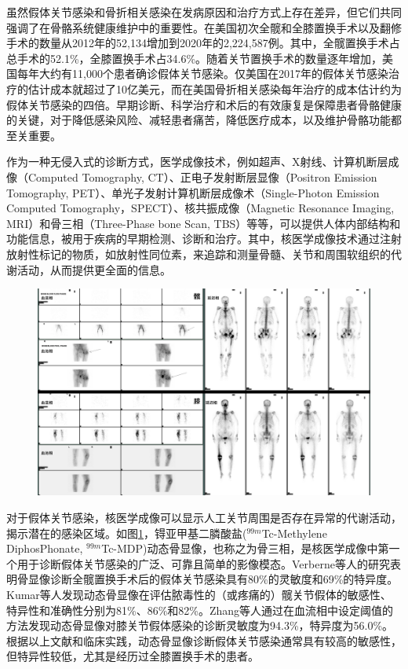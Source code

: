 虽然假体关节感染和骨折相关感染在发病原因和治疗方式上存在差异，但它们共同强调了在骨骼系统健康维护中的重要性。在美国初次全髋和全膝置换手术以及翻修手术的数量从2012年的52,134增加到2020年的2,224,587例。其中，全髋置换手术占总手术的52.1\%，全膝置换手术占34.6\%\cite{AJRR2021}。随着关节置换手术的数量逐年增加，美国每年大约有11,000个患者确诊假体关节感染\cite{kamath2015quantifying}。仅美国在2017年的假体关节感染治疗的估计成本就超过了10亿美元\cite{premkumar2021projected}，而在美国骨折相关感染每年治疗的成本估计约为假体关节感染的四倍\cite{thakore2015surgical}。早期诊断、科学治疗和术后的有效康复是保障患者骨骼健康的关键，对于降低感染风险、减轻患者痛苦，降低医疗成本，以及维护骨骼功能都至关重要。

作为一种无侵入式的诊断方式，医学成像技术，例如超声、X射线、计算机断层成像（Computed Tomography, CT）、正电子发射断层显像（Positron Emission Tomography, PET）、单光子发射计算机断层成像术（Single-Photon Emission Computed Tomography，SPECT）、核共振成像（Magnetic Resonance Imaging, MRI）和骨三相（Three-Phase bone Scan, TBS）等等，可以提供人体内部结构和功能信息，被用于疾病的早期检测、诊断和治疗。其中，核医学成像技术通过注射放射性标记的物质，如放射性同位素，来追踪和测量骨髓、关节和周围软组织的代谢活动，从而提供更全面的信息。

\begin{figure}[ht]
  \centering
  \includegraphics[width=\textwidth]{figures/chap01_DBS.jpg}
  \label{fig:chap01_DBS}
\end{figure}

对于假体关节感染，核医学成像可以显示人工关节周围是否存在异常的代谢活动，揭示潜在的感染区域。如图\ref{fig:chap01_DBS}，锝亚甲基二膦酸盐(\(^{99m}\)Tc-Methylene DiphosPhonate, \(^{99m}\)Tc-MDP)动态骨显像，也称之为骨三相，是核医学成像中第一个用于诊断假体关节感染的广泛、可靠且简单的影像模态\cite{niccoli2017bone}。Verberne等人\cite{verberne2016accuracy}的研究表明骨显像诊断全髋置换手术后的假体关节感染具有80\%的灵敏度和69\%的特异度。Kumar等人\cite{kumar2016comparative}发现动态骨显像在评估脓毒性的（或疼痛的）髋关节假体的敏感性、特异性和准确性分别为81\%、86\%和82\%。Zhang等人\cite{zhang2022temporal}通过在血流相中设定阈值的方法发现动态骨显像对膝关节假体感染的诊断灵敏度为94.3\%，特异度为56.0\%。根据以上文献和临床实践，动态骨显像诊断假体关节感染通常具有较高的敏感性，但特异性较低，尤其是经历过全膝置换手术的患者。

